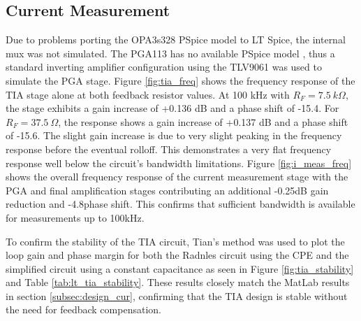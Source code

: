 \subsection{Current Measurement}
Due to problems porting the OPA3s328 PSpice model to LT Spice, the internal mux was not simulated. The PGA113 has no available PSpice model \cite{PGA113PspiceModel2022}, thus a standard inverting amplifier configuration using the TLV9061 was used to simulate the PGA stage. Figure \ref{fig:tia_freq} shows the frequency response of the TIA stage alone at both feedback resistor values. At 100 kHz with $R_F = 7.5~k\Omega$, the stage exhibits a gain increase of +0.136 dB and a phase shift of -15.4\textdegree. For $R_F = 37.5~\Omega$, the response shows a gain increase of +0.137 dB and a phase shift of -15.6\textdegree. The slight gain increase is due to very slight peaking in the frequency response before the eventual rolloff. This demonstrates a very flat frequency response well below the circuit's bandwidth limitations. Figure \ref{fig:i_meas_freq} shows the overall frequency response of the current measurement stage with the PGA and final amplification stages contributing an additional -0.25dB gain reduction and -4.8\textdegree phase shift. This confirms that sufficient bandwidth is available for measurements up to 100kHz.

To confirm the stability of the TIA circuit, Tian's method was used to plot the loop gain and phase margin for both the Radnles circuit using the \ac{CPE} and the simplified circuit using a constant capacitance as seen in Figure \ref{fig:tia_stability} and Table \ref{tab:lt_tia_stability}. These results closely match the MatLab results in section \ref{subsec:design_cur}, confirming that the TIA design is stable without the need for feedback compensation.

